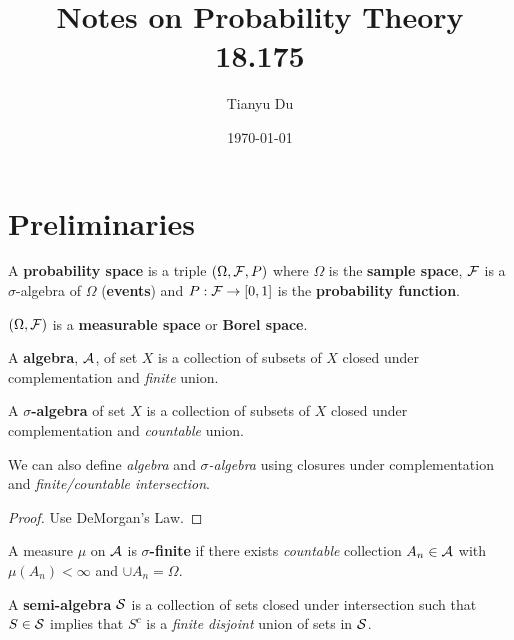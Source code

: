 \documentclass[11pt]{article}
\title{Notes on Probability Theory \\ 18.175}
\date{\today}
\author{Tianyu Du}
\begin{document}
	\maketitle
	\tableofcontents
	
	\section{Preliminaries}
		\begin{definition}
			A \textbf{probability space} is a triple $(\Omega, \mathcal{{F}}, P)$ where $\Omega$ is the \textbf{sample space}, $\mathcal{{F}}$ is a $\sigma$-algebra of $\Omega$ (\textbf{events}) and $P: \mathcal{{F}} \to [0,1]$ is the \textbf{probability function}.
		\end{definition}

		\begin{remark}
			$(\Omega, \mathcal{{F}})$ is a \textbf{measurable space} or \textbf{Borel space}.
		\end{remark}
		
		\begin{definition}
			A \textbf{algebra}, $\mathcal{{A}}$, of set $X$ is a collection of subsets of $X$ closed under complementation and \emph{finite} union.
		\end{definition}
		
		\begin{definition}
			A \textbf{$\sigma$-algebra} of set $X$ is a collection of subsets of $X$ closed under complementation and \emph{countable} union.
		\end{definition}
		
		\begin{remark}
			We can also define \emph{algebra} and \emph{$\sigma$-algebra} using closures under complementation and \emph{finite/countable intersection}.
		\end{remark}
		\begin{proof}
			Use DeMorgan's Law.
		\end{proof}
		
		\begin{definition}
			A measure $\mu$ on $\mathcal{{A}}$ is \textbf{$\sigma$-finite} if there exists \emph{countable} collection $A_n \in \mathcal{{A}}$ with $\mu(A_n) < \infty$ and $\cup A_n = \Omega$.
		\end{definition}
		
		\begin{definition}
			A \textbf{semi-algebra} $\mathcal{{S}}$ is a collection of sets closed under intersection such that $S \in \mathcal{{S}}$ implies that $S^c$ is a \emph{finite disjoint} union of sets in $\mathcal{{S}}$.
		\end{definition}
		
\end{document}
